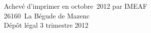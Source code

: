 \cleardoublepage
\mbox{}
\vfill

{\scriptsize
\begin{center}
Achevé d'imprimer en octobre~2012 par IMEAF \\
26160~La Bégude de Mazenc \\[\baselineskip]

Dépôt légal\frcolon{} 3 trimestre 2012
\end{center}
}
\enlargethispage{\footskip}


